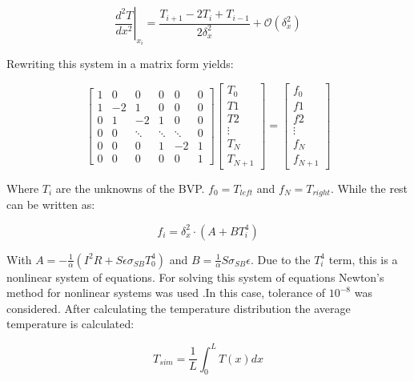 \begin{equation}
    \left. \frac{d^2 T}{dx^2}\right|_{x_i} = \frac{T_{i+1}-2T_i + T_{i-1}}{2\delta_x^2} + \mathcal{O}(\delta_x^2)
\end{equation}

Rewriting this system in a matrix form yields: 

\begin{equation}
    \begin{bmatrix}
   1 &  0 & 0 & 0 & 0 & 0\\
   1 & -2 & 1 & 0 & 0 & 0\\
   0 & 1 & -2 & 1 & 0 & 0\\
   0 & 0 & \ddots & \ddots & \ddots & 0 \\
   0 & 0 & 0 & 1 & -2 & 1 \\
   0 & 0 & 0 & 0 & 0 & 1
   \end{bmatrix}
   \begin{bmatrix}
       T_0 \\ T1 \\ T2 \\ \vdots \\ T_N \\ T_{N+1}
   \end{bmatrix}
    = 
\begin{bmatrix}
   f_0 \\ f1 \\ f2 \\ \vdots \\ f_N \\ f_{N+1}
\end{bmatrix}
\end{equation}

Where $T_i$ are the unknowns of the BVP. $f_0 = T_{left}$ and $f_N = T_{right}$. While the rest can be written as:

\begin{equation}
    f_i = \delta^2_x \cdot \left( A + B T^4_i \right)
\end{equation}

With $A = -\frac{1}{\alpha}\left(I^2 R + S\epsilon \sigma_{SB}T_0^4\right)$ and $B = \frac{1}{\alpha}S \sigma_{SB}\epsilon$. Due to the $T_i^4$ term, this is a nonlinear system of equations. For solving this system of equations Newton's method for nonlinear systems was used \parencite[][]{ref:AlvaroBook}.In this case, tolerance of $10^{-8}$ was considered. After calculating the temperature distribution the average temperature is calculated:

\begin{equation}
    T_{sim} = \frac{1}{L}\int_{0}^{L} T(x) dx
\end{equation}

